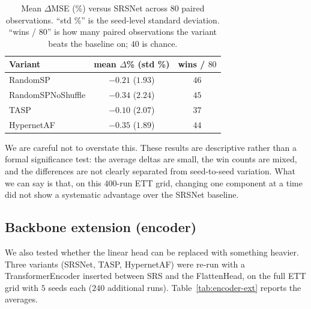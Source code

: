 \documentclass[10pt]{article}
\begin{document}
\begin{table}[t]
  \caption{Mean $\Delta$MSE (\%) versus SRSNet across $80$ paired
    observations. ``std \%'' is the seed-level standard deviation.
    ``wins / $80$'' is how many paired observations the variant
    beats the baseline on; $40$ is chance.}
  \label{tab:variant-stats}
  \begin{center}
  \small
  \begin{tabular}{lcc}
    \toprule
    Variant & mean $\Delta$\% (std \%) & wins / $80$ \\
    \midrule
    RandomSP             & $-0.21$ ($1.93$) & $46$ \\
    RandomSPNoShuffle    & $-0.34$ ($2.24$) & $45$ \\
    TASP                 & $-0.10$ ($2.07$) & $37$ \\
    HypernetAF           & $-0.35$ ($1.89$) & $44$ \\
    \bottomrule
  \end{tabular}
  \end{center}
\end{table}

We are careful not to overstate this. These results are descriptive
rather than a formal significance test: the average deltas are small,
the win counts are mixed, and the differences are not clearly
separated from seed-to-seed variation. What we can say is that, on
this $400$-run ETT grid, changing one component at a time did not
show a systematic advantage over the SRSNet baseline.

\subsection{Backbone extension (encoder)}
\label{sec:results-encoder}

We also tested whether the linear head can be replaced with
something heavier. Three variants (SRSNet, TASP, HypernetAF) were
re-run with a TransformerEncoder inserted between SRS and the
FlattenHead, on the full ETT grid with $5$ seeds each ($240$
additional runs). Table~\ref{tab:encoder-ext} reports the averages.
\end{document}
